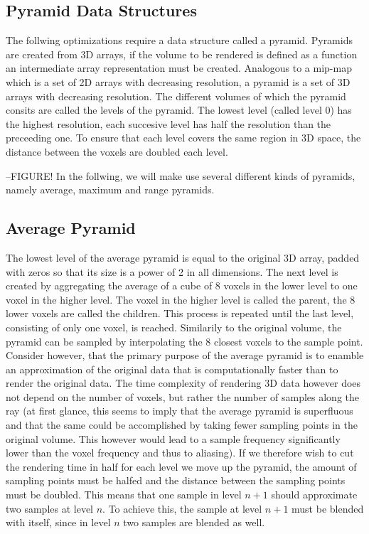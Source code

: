 \subsection{Pyramid Data Structures}
The follwing optimizations require a data structure called a pyramid. Pyramids are created from 3D arrays, if the volume to be rendered is defined as a function an intermediate array representation must be created.
Analogous to a mip-map which is a set of 2D arrays with decreasing resolution, a pyramid is a set of 3D arrays with decreasing resolution. The different volumes of which the pyramid consits are called the levels of the pyramid. The lowest level (called level 0) has the highest resolution, each succesive level has half the resolution than the preceeding one. To ensure that each level covers the same region in 3D space, the distance between the voxels are doubled each level.

--FIGURE!
In the follwing, we will make use several different kinds of pyramids, namely average, maximum and range pyramids.
\subsection{Average Pyramid}
The lowest level of the average pyramid is equal to the original 3D array, padded with zeros so that its size is a power of 2 in all dimensions.
The next level is created by aggregating the average of a cube of 8 voxels in the lower level to one voxel in the higher level. The voxel in the higher level is called the parent, the 8 lower voxels are called the children. This process is repeated until the last level, consisting of only one voxel, is reached. 
Similarily to the original volume, the pyramid can be sampled by interpolating the 8 closest voxels to the sample point. Consider however, that the primary purpose of the average pyramid is to enamble an approximation of the original data that is computationally faster than to render the original data.
The time complexity of rendering 3D data however does not depend on the number of voxels, but rather the number of samples along the ray (at first glance, this seems to imply that the average pyramid is superfluous and that the same could be accomplished by taking fewer sampling points in the original volume. This however would lead to a sample frequency significantly lower than the voxel frequency and thus to aliasing). If we therefore wish to cut the rendering time in half for each level we move up the pyramid, the amount of sampling points must be halfed and the distance between the sampling points must be doubled. This means that one sample in level $n+1$ should approximate two samples at level $n$. To achieve this, the sample at level $n+1$ must be blended with itself, since in level $n$ two samples are blended as well.


